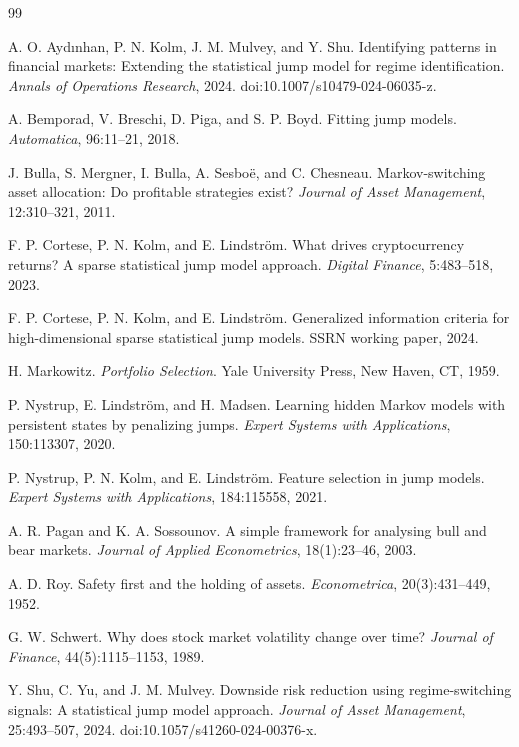 \documentclass[11pt]{article}
\begin{document}
\begin{thebibliography}{99}

A. O. Ayd{\i}nhan, P. N. Kolm, J. M. Mulvey, and Y. Shu.
\newblock Identifying patterns in financial markets: Extending the statistical
jump model for regime identification.
\newblock \emph{Annals of Operations Research}, 2024.
\newblock doi:10.1007/s10479-024-06035-z.

A. Bemporad, V. Breschi, D. Piga, and S. P. Boyd.
\newblock Fitting jump models.
\newblock \emph{Automatica}, 96:11--21, 2018.

J. Bulla, S. Mergner, I. Bulla, A. Sesbo\"e, and C. Chesneau.
\newblock Markov-switching asset allocation: Do profitable strategies exist?
\newblock \emph{Journal of Asset Management}, 12:310--321, 2011.

F. P. Cortese, P. N. Kolm, and E. Lindstr\"om.
\newblock What drives cryptocurrency returns? A sparse statistical jump model
approach.
\newblock \emph{Digital Finance}, 5:483--518, 2023.

F. P. Cortese, P. N. Kolm, and E. Lindstr\"om.
\newblock Generalized information criteria for high-dimensional sparse
statistical jump models.
\newblock SSRN working paper, 2024.

H. Markowitz.
\newblock \emph{Portfolio Selection}.
\newblock Yale University Press, New Haven, CT, 1959.

P. Nystrup, E. Lindstr\"om, and H. Madsen.
\newblock Learning hidden Markov models with persistent states by penalizing
jumps.
\newblock \emph{Expert Systems with Applications}, 150:113307, 2020.

P. Nystrup, P. N. Kolm, and E. Lindstr\"om.
\newblock Feature selection in jump models.
\newblock \emph{Expert Systems with Applications}, 184:115558, 2021.

A. R. Pagan and K. A. Sossounov.
\newblock A simple framework for analysing bull and bear markets.
\newblock \emph{Journal of Applied Econometrics}, 18(1):23--46, 2003.

A. D. Roy.
\newblock Safety first and the holding of assets.
\newblock \emph{Econometrica}, 20(3):431--449, 1952.

G. W. Schwert.
\newblock Why does stock market volatility change over time?
\newblock \emph{Journal of Finance}, 44(5):1115--1153, 1989.

Y. Shu, C. Yu, and J. M. Mulvey.
\newblock Downside risk reduction using regime-switching signals: A statistical
jump model approach.
\newblock \emph{Journal of Asset Management}, 25:493--507, 2024.
\newblock doi:10.1057/s41260-024-00376-x.

\end{thebibliography}
\end{document}
